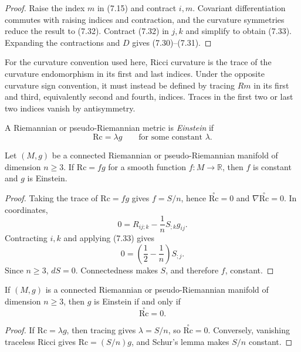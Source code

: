 \begin{proof}
\sketch Raise the index $m$ in (7.15) and contract $i,m$. Covariant
differentiation commutes with raising indices and contraction, and the
curvature symmetries reduce the result to (7.32). Contract (7.32) in $j,k$
and simplify to obtain (7.33). Expanding the contractions and $D$ gives
(7.30)--(7.31).
\end{proof}

For the curvature convention used here, Ricci curvature is the trace of the
curvature endomorphism in its first and last indices. Under the opposite
curvature sign convention, it must instead be defined by tracing $Rm$ in its
first and third, equivalently second and fourth, indices. Traces in the first
two or last two indices vanish by antisymmetry.

A Riemannian or pseudo-Riemannian metric is \emph{Einstein} if
\begin{equation}
\mathrm{Rc}=\lambda g
\qquad\text{for some constant }\lambda.
\tag{7.34}
\end{equation}

\begin{proposition}
\label{prop:schur-lemma}

Let $(M,g)$ be a connected Riemannian or pseudo-Riemannian manifold of
dimension $n\geq3$. If $\mathrm{Rc}=fg$ for a smooth function
$f:M\to\mathbb R$, then $f$ is constant and $g$ is Einstein.
\end{proposition}

\begin{proof}
\sketch Taking the trace of $\mathrm{Rc}=fg$ gives $f=S/n$, hence
$\stackrel{\circ}{\mathrm{Rc}}=0$ and
$\nabla\stackrel{\circ}{\mathrm{Rc}}=0$. In coordinates,
\[
0=R_{ij;k}-\frac1nS_{;k}g_{ij}.
\]
Contracting $i,k$ and applying (7.33) gives
\[
0=\left(\frac12-\frac1n\right)S_{;j}.
\]
Since $n\geq3$, $dS=0$. Connectedness makes $S$, and therefore $f$, constant.
\end{proof}

\begin{corollary}
\label{cor:einstein-zero-ricci}

If $(M,g)$ is a connected Riemannian or pseudo-Riemannian manifold of
dimension $n\geq3$, then $g$ is Einstein if and only if
\[
\stackrel{\circ}{\mathrm{Rc}}=0.
\]
\end{corollary}

\begin{proof}
\sketch If $\mathrm{Rc}=\lambda g$, then tracing gives $\lambda=S/n$, so
$\stackrel{\circ}{\mathrm{Rc}}=0$. Conversely, vanishing traceless Ricci gives
$\mathrm{Rc}=(S/n)g$, and Schur's lemma makes $S/n$ constant.
\end{proof}

